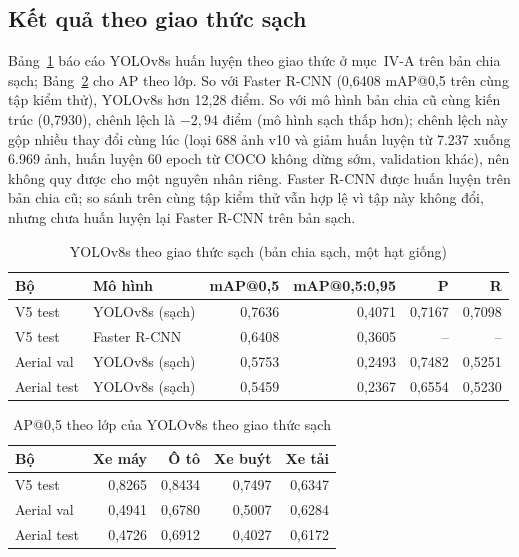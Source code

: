 \documentclass[10pt,journal,letterpaper]{IEEEtran}
\begin{document}
\subsection{Kết quả theo giao thức sạch}
Bảng~\ref{tab:clean} báo cáo YOLOv8s huấn luyện theo giao thức ở mục~IV-A trên bản chia sạch; Bảng~\ref{tab:cleancls} cho AP theo lớp. So với Faster R-CNN (0,6408 mAP@0,5 trên cùng tập kiểm thử), YOLOv8s hơn 12,28 điểm. So với mô hình bản chia cũ cùng kiến trúc (0,7930), chênh lệch là $-2{,}94$ điểm (mô hình sạch thấp hơn); chênh lệch này gộp nhiều thay đổi cùng lúc (loại 688 ảnh v10 và giảm huấn luyện từ 7.237 xuống 6.969 ảnh, huấn luyện 60 epoch từ COCO không dừng sớm, validation khác), nên không quy được cho một nguyên nhân riêng. Faster R-CNN được huấn luyện trên bản chia cũ; so sánh trên cùng tập kiểm thử vẫn hợp lệ vì tập này không đổi, nhưng chưa huấn luyện lại Faster R-CNN trên bản sạch.

\begin{table}[!t]
\caption{YOLOv8s theo giao thức sạch (bản chia sạch, một hạt giống)}
\label{tab:clean}
\centering
\footnotesize
\begin{tabular}{llrrrr}
\toprule
Bộ & Mô hình & mAP@0,5 & mAP@0,5:0,95 & P & R \\
\midrule
V5 test & YOLOv8s (sạch) & 0,7636 & 0,4071 & 0,7167 & 0,7098 \\
V5 test & Faster R-CNN & 0,6408 & 0,3605 & -- & -- \\
Aerial val & YOLOv8s (sạch) & 0,5753 & 0,2493 & 0,7482 & 0,5251 \\
Aerial test & YOLOv8s (sạch) & 0,5459 & 0,2367 & 0,6554 & 0,5230 \\
\bottomrule
\end{tabular}
\end{table}

\begin{table}[!t]
\caption{AP@0,5 theo lớp của YOLOv8s theo giao thức sạch}
\label{tab:cleancls}
\centering
\footnotesize
\begin{tabular}{lrrrr}
\toprule
Bộ & Xe máy & Ô tô & Xe buýt & Xe tải \\
\midrule
V5 test & 0,8265 & 0,8434 & 0,7497 & 0,6347 \\
Aerial val & 0,4941 & 0,6780 & 0,5007 & 0,6284 \\
Aerial test & 0,4726 & 0,6912 & 0,4027 & 0,6172 \\
\bottomrule
\end{tabular}
\end{table}
\end{document}
